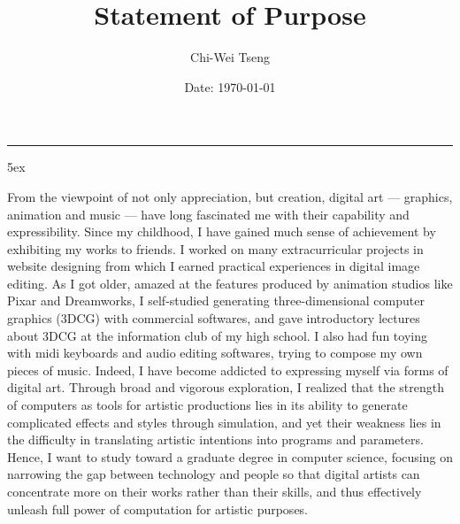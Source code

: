 \documentclass[a4paper, 12pt]{article}
\title{Statement of Purpose}
\author{Chi-Wei Tseng}
\date{Date: \today}
\makeatletter
\newcommand{\HRule}{\rule{\linewidth}{0.2mm}}
\renewcommand{\maketitle}{
  \parindent=0pt%
  \begin{flushleft}
  \bf \large{\@author}
  \HRule
  \end{flushleft}
  \begin{center}
    \MakeUppercase{\bf \@title}
  \end{center}%
    \par
}
\makeatother
\begin{document}
{\linespread{0.8} \maketitle}
\parindent 5ex

From the viewpoint of not only appreciation, but creation, digital art --- graphics, animation and music --- have long fascinated me with their capability and expressibility. Since my childhood, I have gained much sense of achievement by exhibiting my works to friends. I worked on many extracurricular projects in website designing from which I earned practical experiences in digital image editing. As I got older, amazed at the features produced by animation studios like Pixar and Dreamworks, I self-studied generating three-dimensional computer graphics (3DCG) with commercial softwares, and gave introductory lectures about 3DCG at the information club of my high school. I also had fun toying with midi keyboards and audio editing softwares, trying to compose my own pieces of music. Indeed, I have become addicted to expressing myself via forms of digital art. Through broad and vigorous exploration, I realized that the strength of computers as tools for artistic productions lies in its ability to generate complicated effects and styles through simulation, and yet their weakness lies in the difficulty in translating artistic intentions into programs and parameters. Hence, I want to study toward a graduate degree in computer science, focusing on narrowing the gap between technology and people so that digital artists can concentrate more on their works rather than their skills, and thus effectively unleash full power of computation for artistic purposes.\\

\end{document}
